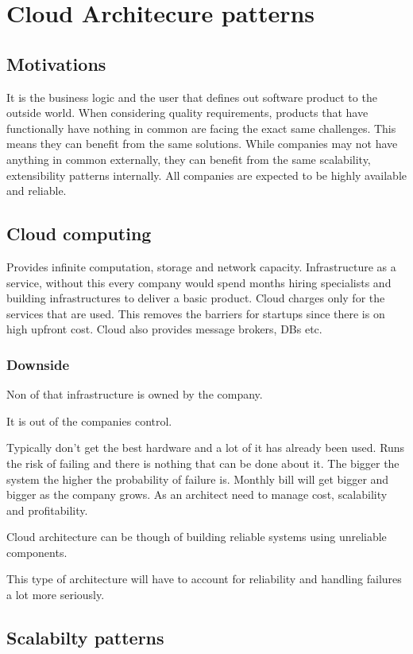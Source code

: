 \chapter{Cloud Architecure patterns}

\section{Motivations}
It is the business logic and the user that defines out software product to the outside world.
When considering quality requirements, products that have functionally have nothing in common are facing the exact same challenges.
This means they can benefit from the same solutions.
While companies may not have anything in common externally, they can benefit from the same scalability, extensibility patterns internally.
All companies are expected to be highly available and reliable.

\section{Cloud computing}
Provides infinite computation, storage and network capacity.
Infrastructure as a service, without this every company would spend months hiring specialists and building infrastructures to deliver a basic product.
Cloud charges only for the services that are used.
This removes the barriers for startups since there is on high upfront cost.
Cloud also provides message brokers, DBs etc.

\subsection{Downside}
Non of that infrastructure is owned by the company.

It is out of the companies control.

Typically don't get the best hardware and a lot of it has already been used.
Runs the risk of failing and there is nothing that can be done about it.
The bigger the system the higher the probability of failure is.
Monthly bill will get bigger and bigger as the company grows.
As an architect need to manage cost, scalability and profitability.

Cloud architecture can be though of building reliable systems using unreliable components.

This type of architecture will have to account for reliability and handling failures a lot more seriously.

\section{Scalabilty patterns}

